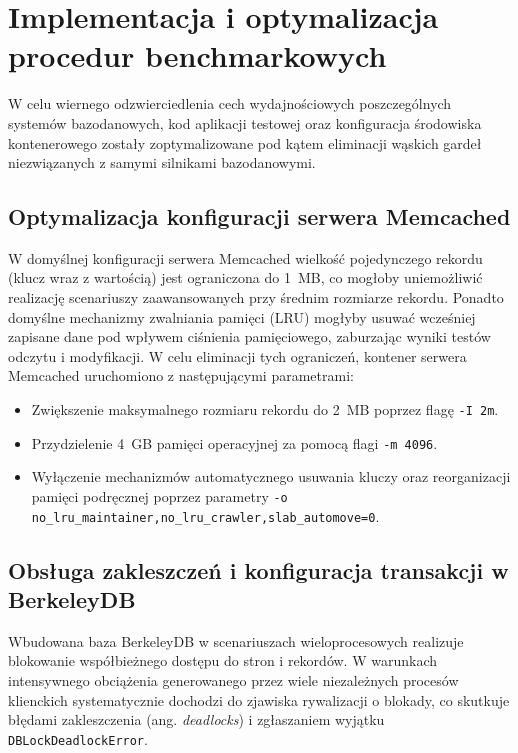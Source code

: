 

\section{Implementacja i optymalizacja procedur benchmarkowych}

W celu wiernego odzwierciedlenia cech wydajnościowych poszczególnych systemów bazodanowych, kod aplikacji testowej oraz konfiguracja środowiska kontenerowego zostały zoptymalizowane pod kątem eliminacji wąskich gardeł niezwiązanych z samymi silnikami bazodanowymi.

\subsection{Optymalizacja konfiguracji serwera Memcached}
W domyślnej konfiguracji serwera Memcached wielkość pojedynczego rekordu (klucz wraz z wartością) jest ograniczona do 1~MB, co mogłoby uniemożliwić realizację scenariuszy zaawansowanych przy średnim rozmiarze rekordu. Ponadto domyślne mechanizmy zwalniania pamięci (LRU) mogłyby usuwać wcześniej zapisane dane pod wpływem ciśnienia pamięciowego, zaburzając wyniki testów odczytu i modyfikacji. W celu eliminacji tych ograniczeń, kontener serwera Memcached uruchomiono z następującymi parametrami:
\begin{itemize}
    \item Zwiększenie maksymalnego rozmiaru rekordu do 2~MB poprzez flagę \texttt{-I 2m}.
    \item Przydzielenie 4~GB pamięci operacyjnej za pomocą flagi \texttt{-m 4096}.
    \item Wyłączenie mechanizmów automatycznego usuwania kluczy oraz reorganizacji pamięci podręcznej poprzez parametry \texttt{-o no\_lru\_maintainer,no\_lru\_crawler,slab\_automove=0}.
\end{itemize}

\subsection{Obsługa zakleszczeń i konfiguracja transakcji w BerkeleyDB}
Wbudowana baza BerkeleyDB w scenariuszach wieloprocesowych realizuje blokowanie współbieżnego dostępu do stron i rekordów. W warunkach intensywnego obciążenia generowanego przez wiele niezależnych procesów klienckich systematycznie dochodzi do zjawiska rywalizacji o blokady, co skutkuje błędami zakleszczenia (ang. \emph{deadlocks}) i zgłaszaniem wyjątku \texttt{DBLockDeadlockError}.

